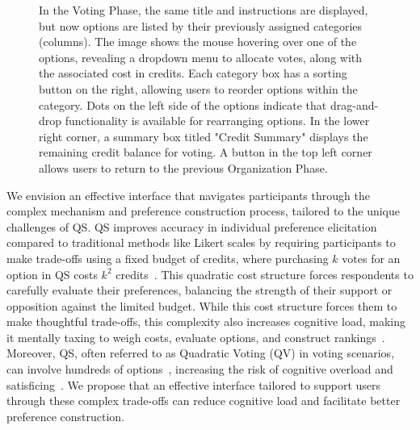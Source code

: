 \begin{figure}[ht]
{    In the Voting Phase, the same title and instructions are displayed, but now options are listed by their previously assigned categories (columns). The image shows the mouse hovering over one of the options, revealing a dropdown menu to allocate votes, along with the associated cost in credits. Each category box has a sorting button on the right, allowing users to reorder options within the category. Dots on the left side of the options indicate that drag-and-drop functionality is available for rearranging options. In the lower right corner, a summary box titled "Credit Summary" displays the remaining credit balance for voting. A button in the top left corner allows users to return to the previous Organization Phase.
    }

\end{figure}

We envision an effective interface that navigates participants through the complex mechanism and preference construction process, tailored to the unique challenges of QS. QS improves accuracy in individual preference elicitation compared to traditional methods like Likert scales by requiring participants to make trade-offs using a fixed budget of credits, where purchasing $k$ votes for an option in QS costs $k^2$ credits~\cite{quarfoot2017quadratic,chengCanShowWhat2021}. This quadratic cost structure forces respondents to carefully evaluate their preferences, balancing the strength of their support or opposition against the limited budget. While this cost structure forces them to make thoughtful trade-offs, this complexity also increases cognitive load, making it mentally taxing to weigh costs, evaluate options, and construct rankings~\cite{lichtensteinConstructionPreference2006}. Moreover, QS, often referred to as Quadratic Voting (QV) in voting scenarios, can involve hundreds of options~\cite{rogersColoradoTriedNew2019, teamTaiwanDigitalMinister}, increasing the risk of cognitive overload and satisficing~\cite{simonBehavioralModelRational1955, payneAdaptiveStrategySelection1988, tverskyJudgmentsRepresentativeness}. We propose that an effective interface tailored to support users through these complex trade-offs can reduce cognitive load and facilitate better preference construction.



